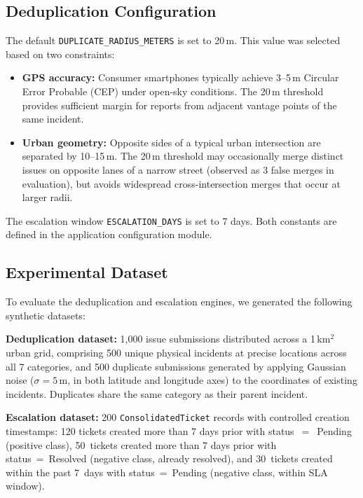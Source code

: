 \documentclass[conference]{IEEEtran}
\begin{document}
\subsection{Deduplication Configuration}

The default \texttt{DUPLICATE\_RADIUS\_METERS} is set to 20\,m. This value was selected based on two constraints:

\begin{itemize}
\item \textbf{GPS accuracy:} Consumer smartphones typically achieve 3--5\,m Circular Error Probable (CEP) under open-sky conditions. The 20\,m threshold provides sufficient margin for reports from adjacent vantage points of the same incident.
\item \textbf{Urban geometry:} Opposite sides of a typical urban intersection are separated by 10--15\,m. The 20\,m threshold may occasionally merge distinct issues on opposite lanes of a narrow street (observed as 3 false merges in evaluation), but avoids widespread cross-intersection merges that occur at larger radii.
\end{itemize}

The escalation window \texttt{ESCALATION\_DAYS} is set to 7 days. Both constants are defined in the application configuration module.

\subsection{Experimental Dataset}

To evaluate the deduplication and escalation engines, we generated the following synthetic datasets:

\textbf{Deduplication dataset:} 1{,}000 issue submissions distributed across a 1\,km$^2$ urban grid, comprising 500 unique physical incidents at precise locations across all 7 categories, and 500 duplicate submissions generated by applying Gaussian noise ($\sigma = 5$\,m, in both latitude and longitude axes) to the coordinates of existing incidents. Duplicates share the same category as their parent incident.

\textbf{Escalation dataset:} 200 \texttt{ConsolidatedTicket} records with controlled creation timestamps: 120 tickets created more than 7 days prior with status~$=$~Pending (positive class), 50~tickets created more than 7 days prior with status~=~Resolved (negative class, already resolved), and 30~tickets created within the past 7~days with status~=~Pending (negative class, within SLA window).
\end{document}

